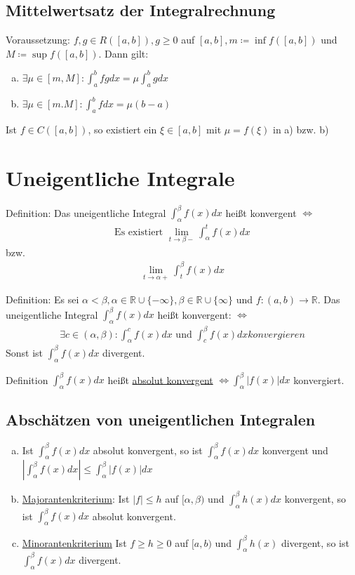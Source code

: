\documentclass{article}
\begin{document}
\subsection{Mittelwertsatz der Integralrechnung}
Voraussetzung: $f,g \in R([a,b]), g \geq 0$ auf $[a,b], m \coloneqq \inf f([a,b])$ und $M \coloneqq \sup f([a,b])$. Dann gilt: \\
\begin{enumerate} [a)]
    \item $\exists \mu \in [m,M]: \int_a^b fg dx = \mu \int_a^b g dx$
    \item $\exists \mu \in [m.M]: \int_a^b f dx = \mu (b-a)$
\end{enumerate}
Ist $f \in C([a,b])$, so existiert ein $\xi \in [a,b]$ mit $\mu = f(\xi)$ in a) bzw. b)

\section{Uneigentliche Integrale}
Definition: Das uneigentliche Integral $\int_\alpha^\beta f(x)dx$ heißt konvergent $\Leftrightarrow$ 
\begin{align*}
    \text{Es existiert } \lim \limits_{t \to \beta -} \int_\alpha^t f(x)dx
\end{align*}
bzw.
\begin{align*}
    \lim \limits_{t \to \alpha +} \int_t^\beta f(x) dx
\end{align*}

Definition: Es sei $\alpha < \beta, \alpha \in \mathbb{R} \cup \{-\infty\}, \beta \in \mathbb{R} \cup \{\infty\}$ und 
$f:(a,b) \to \mathbb{R}$. Das uneigentliche Integral $\int_\alpha^\beta f(x) dx$ heißt konvergent: $\Leftrightarrow$
\begin{align*}
    \exists c \in (\alpha, \beta): \int_\alpha^c f(x)dx \text{ und } \int_c^\beta f(x)dx konvergieren
\end{align*}
Sonst ist $\int_\alpha^\beta f(x)dx$ divergent.

Definition $\int_\alpha^\beta f(x)dx$ heißt \underline{absolut konvergent} $\Leftrightarrow \int_\alpha^\beta |f(x)| dx$ konvergiert.

\subsection{Abschätzen von uneigentlichen Integralen}
\begin{enumerate} [a)]
    \item Ist $\int_\alpha^\beta f(x) dx$ absolut konvergent, so ist $\int_\alpha^\beta f(x) dx$ konvergent und 
    $|\int_\alpha^\beta f(x) dx| \leq \int_\alpha^\beta |f(x)| dx$
    \item \underline{Majorantenkriterium}: Ist $|f| \leq h$ auf $[\alpha,\beta)$ und $\int_\alpha^\beta h(x)dx$ konvergent, so ist
    $\int_\alpha^\beta f(x)dx$ absolut konvergent.
    \item \underline{Minorantenkriterium} Ist $f\geq h \geq 0$ auf $[a,b)$ und $\int_\alpha^\beta h(x)$ divergent, so ist 
    $\int_\alpha^\beta f(x)dx$ divergent.
\end{enumerate}
\end{document}
